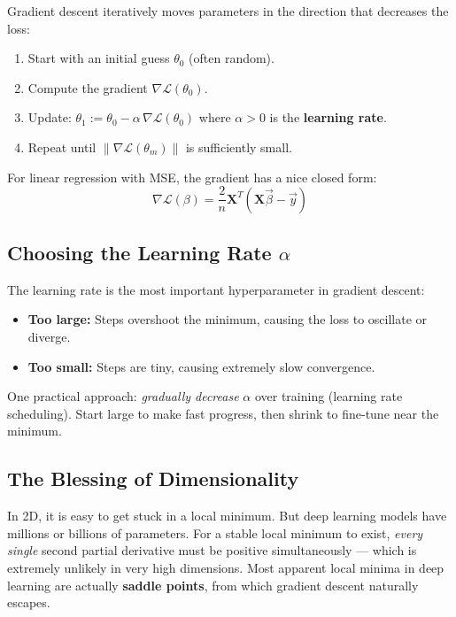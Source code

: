 \documentclass[12pt]{article}
\begin{document}
Gradient descent iteratively moves parameters in the direction that decreases the loss:

\begin{enumerate}
  \item Start with an initial guess $\theta_0$ (often random).
  \item Compute the gradient $\nabla\mathcal{L}(\theta_0)$.
  \item Update: $\theta_1 := \theta_0 - \alpha\,\nabla\mathcal{L}(\theta_0)$ \quad where $\alpha > 0$ is the \textbf{learning rate}.
  \item Repeat until $\|\nabla\mathcal{L}(\theta_m)\|$ is sufficiently small.
\end{enumerate}

For linear regression with MSE, the gradient has a nice closed form:
\[
\nabla\mathcal{L}(\beta) = \frac{2}{n}\boldsymbol{X}^T\!\left(\boldsymbol{X}\vec{\beta} - \vec{y}\right)
\]

\subsection{Choosing the Learning Rate $\alpha$}

The learning rate is the most important hyperparameter in gradient descent:

\begin{itemize}
  \item \textbf{Too large:} Steps overshoot the minimum, causing the loss to oscillate or diverge.
  \item \textbf{Too small:} Steps are tiny, causing extremely slow convergence.
\end{itemize}

One practical approach: \emph{gradually decrease} $\alpha$ over training (learning rate scheduling). Start large to make fast progress, then shrink to fine-tune near the minimum.

\subsection{The Blessing of Dimensionality}

In 2D, it is easy to get stuck in a local minimum. But deep learning models have millions or billions of parameters. For a stable local minimum to exist, \emph{every single} second partial derivative must be positive simultaneously --- which is extremely unlikely in very high dimensions. Most apparent local minima in deep learning are actually \textbf{saddle points}, from which gradient descent naturally escapes.
\end{document}
